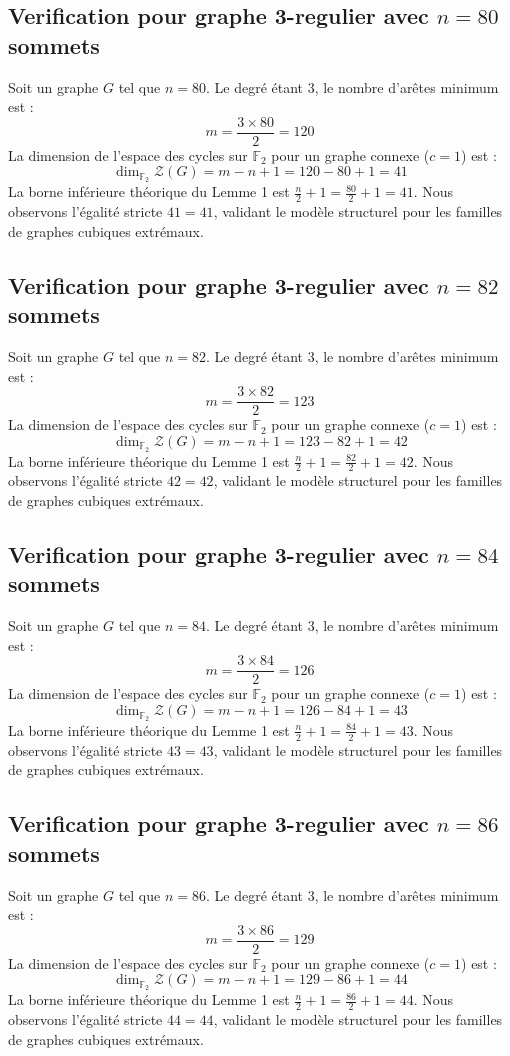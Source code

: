 \documentclass[11pt,a4paper]{article}
\begin{document}
\subsection{Verification pour graphe 3-regulier avec $n=80$ sommets}
Soit un graphe $G$ tel que $n = 80$. Le degré étant 3, le nombre d'arêtes minimum est :
$$ m = \frac{3 \times 80}{2} = 120 $$
La dimension de l'espace des cycles sur $\mathbb{F}_2$ pour un graphe connexe ($c=1$) est :
$$ \dim_{\mathbb{F}_2} \mathcal{Z}(G) = m - n + 1 = 120 - 80 + 1 = 41 $$
La borne inférieure théorique du Lemme 1 est $\frac{n}{2} + 1 = \frac{80}{2} + 1 = 41$.
Nous observons l'égalité stricte $41 = 41$, validant le modèle structurel pour les familles de graphes cubiques extrémaux.

\subsection{Verification pour graphe 3-regulier avec $n=82$ sommets}
Soit un graphe $G$ tel que $n = 82$. Le degré étant 3, le nombre d'arêtes minimum est :
$$ m = \frac{3 \times 82}{2} = 123 $$
La dimension de l'espace des cycles sur $\mathbb{F}_2$ pour un graphe connexe ($c=1$) est :
$$ \dim_{\mathbb{F}_2} \mathcal{Z}(G) = m - n + 1 = 123 - 82 + 1 = 42 $$
La borne inférieure théorique du Lemme 1 est $\frac{n}{2} + 1 = \frac{82}{2} + 1 = 42$.
Nous observons l'égalité stricte $42 = 42$, validant le modèle structurel pour les familles de graphes cubiques extrémaux.

\subsection{Verification pour graphe 3-regulier avec $n=84$ sommets}
Soit un graphe $G$ tel que $n = 84$. Le degré étant 3, le nombre d'arêtes minimum est :
$$ m = \frac{3 \times 84}{2} = 126 $$
La dimension de l'espace des cycles sur $\mathbb{F}_2$ pour un graphe connexe ($c=1$) est :
$$ \dim_{\mathbb{F}_2} \mathcal{Z}(G) = m - n + 1 = 126 - 84 + 1 = 43 $$
La borne inférieure théorique du Lemme 1 est $\frac{n}{2} + 1 = \frac{84}{2} + 1 = 43$.
Nous observons l'égalité stricte $43 = 43$, validant le modèle structurel pour les familles de graphes cubiques extrémaux.

\subsection{Verification pour graphe 3-regulier avec $n=86$ sommets}
Soit un graphe $G$ tel que $n = 86$. Le degré étant 3, le nombre d'arêtes minimum est :
$$ m = \frac{3 \times 86}{2} = 129 $$
La dimension de l'espace des cycles sur $\mathbb{F}_2$ pour un graphe connexe ($c=1$) est :
$$ \dim_{\mathbb{F}_2} \mathcal{Z}(G) = m - n + 1 = 129 - 86 + 1 = 44 $$
La borne inférieure théorique du Lemme 1 est $\frac{n}{2} + 1 = \frac{86}{2} + 1 = 44$.
Nous observons l'égalité stricte $44 = 44$, validant le modèle structurel pour les familles de graphes cubiques extrémaux.
\end{document}

